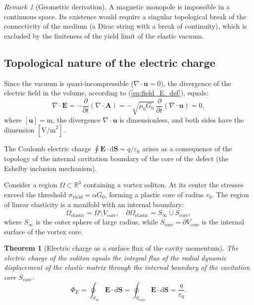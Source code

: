 \documentclass[11pt,a4paper]{article}
\newtheorem{theorem}{Theorem}
\theoremstyle{definition}
\theoremstyle{remark}
\newtheorem{remark}{Remark}
\begin{document}
\begin{remark}[Geometric derivation]
A magnetic monopole is impossible in a continuous space. Its existence would require a singular topological break of the connectivity of the medium (a Dirac string with a break of continuity), which is excluded by the finiteness of the yield limit of the elastic vacuum.
\end{remark}
	
\subsection{Topological nature of the electric charge}
	
Since the vacuum is quasi-incompressible ($\nabla \cdot \mathbf{u} = 0$), the divergence of the electric field in the volume, according to (\ref{eq:field_E_def}), equals:
\begin{equation}
	\nabla \cdot \mathbf{E} = -\frac{\partial}{\partial t}(\nabla \cdot \mathbf{A}) = -\sqrt{\mu_0 G_0} \, \frac{\partial}{\partial t}(\nabla \cdot \mathbf{u}) = 0,
\label{eq:div_E_gauge}
\end{equation}
where $[\mathbf{u}] = \text{m}$, the divergence $\nabla \cdot \mathbf{u}$ is dimensionless, and both sides have the dimension $[\text{V/m}^2]$.
	
The Coulomb electric charge $\oint \mathbf{E} \cdot \mathrm{d}\mathbf{S} = q/\varepsilon_0$ arises as a consequence of the topology of the internal cavitation boundary of the core of the defect (the Eshelby inclusion mechanism).
	
Consider a region $\Omega \subset \mathbb{R}^3$ containing a vortex soliton. At its center the stresses exceed the threshold $\sigma_{\mathrm{yield}} = \alpha G_0$, forming a plastic core of radius $r_0$. The region of linear elasticity is a manifold with an internal boundary:
\begin{equation}
	\Omega_{\mathrm{elastic}} = \Omega \setminus V_{\mathrm{core}}, \quad \partial \Omega_{\mathrm{elastic}} = S_\infty \cup S_{\mathrm{core}},
\label{eq:manifold_boundaries}
\end{equation}
where $S_\infty$ is the outer sphere of large radius, while $S_{\mathrm{core}} = \partial V_{\mathrm{core}}$ is the internal surface of the vortex core.
	
\begin{theorem}[Electric charge as a surface flux of the cavity momentum]
\label{thm:gauss_charge_boundary}
The electric charge of the soliton equals the integral flux of the radial dynamic displacement of the elastic matrix through the internal boundary of the cavitation core $S_{\mathrm{core}}$:
\begin{equation}
	\Phi_E = \oint_{S_\infty} \mathbf{E} \cdot \mathrm{d}\mathbf{S} = \oint_{S_{\mathrm{core}}} \mathbf{E} \cdot \mathrm{d}\mathbf{S} = \frac{q}{\varepsilon_0}.
	\label{eq:gauss_charge_flux}
\end{equation}
\end{theorem}
\end{document}
